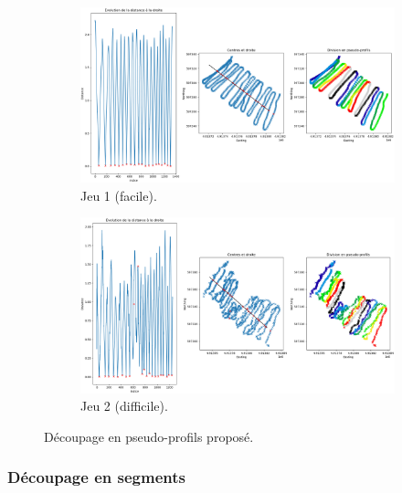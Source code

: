 \documentclass[12pt]{article}
\begin{document}
    \begin{figure}[ht!]
        \centering
        \begin{subfigure}[b]{0.90\textwidth}
            \centering
            \includegraphics[width=\textwidth]{Images/PseudoProf_full_1.png}
            \caption[]%
            {{ \small Jeu 1 (facile).}}    
        \end{subfigure}
        \centering
        \begin{subfigure}[b]{0.90\textwidth}  
            \centering 
            \includegraphics[width=\textwidth]{Images/PseudoProf_full_2.png}
            \caption[]%
            {{\small Jeu 2 (difficile).}}   
            \label{fig:2_pp_2}
        \end{subfigure}
        \caption{Découpage en pseudo-profils proposé.}
    \end{figure}

    \newpage
    \subsubsection{Découpage en segments}
\end{document}
